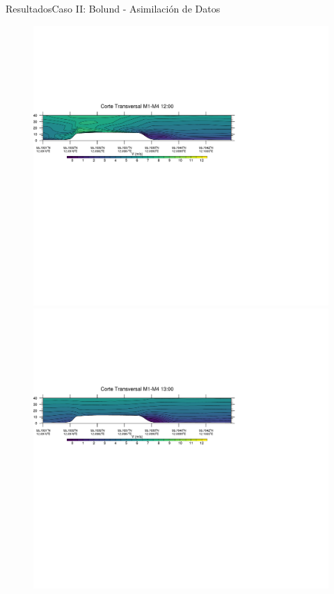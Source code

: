 \documentclass[mathserif,10pt]{beamer}
\begin{document}
\begin{frame}{Resultados}{Caso II: Bolund - Asimilación de Datos}
	\begin{figure}[H]
		\centering
		\includegraphics[width=0.80\linewidth,trim={0mm 202.0mm 111mm 106mm},clip]{fig/06/bol_da/1200rot}\\%
		\includegraphics[width=0.80\linewidth,trim={0mm 202.0mm 111mm 106mm},clip]{fig/06/bol_da/1300rot}\\%

\end{figure}
\end{frame}
\end{document}
